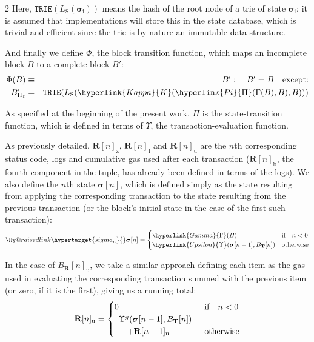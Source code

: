 \documentclass[9pt,oneside]{amsart}
\makeatletter
\newcommand{\linkdest}[1]{\Hy@raisedlink{\hypertarget{#1}{}}}
\makeatother
\begin{document}
\begin{multicols}{2}
Here, $\mathtt{TRIE}(L_{\mathrm{S}}(\boldsymbol{\sigma}_{\mathrm{i}}))$ means the hash of the root node of a trie of state $\boldsymbol{\sigma}_{\mathrm{i}}$; it is assumed that implementations will store this in the state database, which is trivial and efficient since the trie is by nature an immutable data structure.

\hypertarget{Phi}{}And finally we define $\Phi$, the block transition function, which maps an incomplete block $B$ to a complete block $B'$:
\begin{eqnarray}
\Phi(B) & \equiv & B': \quad B' = B \quad \text{except:} \\
{B'_{\mathrm{H}}}_{\mathrm{r}} & = & \mathtt{TRIE}(L_{\mathrm{S}}(\hyperlink{Kappa}{K}(\hyperlink{Pi}{\Pi}(\Gamma(B), B), B)))
\end{eqnarray}

As specified at the beginning of the present work, \hyperlink{Pi}{$\Pi$} is the state-transition function, which is defined in terms of \hyperlink{Upsilon_state_transition}{$\Upsilon$}, the transaction-evaluation function.

As previously detailed, $\mathbf{R}[n]_{\mathrm{z}}$, $\mathbf{R}[n]_{\mathbf{l}}$ and $\mathbf{R}[n]_{\mathrm{u}}$ are the $n$th corresponding status code, logs and cumulative gas used after each transaction ($\mathbf{R}[n]_{\mathrm{b}}$, the fourth component in the tuple, has already been defined in terms of the logs). We also define the $n$th state $\boldsymbol{\sigma}[n]$, which is defined simply as the state resulting from applying the corresponding transaction to the state resulting from the previous transaction (or the block's initial state in the case of the first such transaction):
\begin{equation}\linkdest{sigma_n}{}
\boldsymbol{\sigma}[n] = \begin{cases} \hyperlink{Gamma}{\Gamma}(B) & \text{if} \quad n < 0 \\ \hyperlink{Upsilon}{\Upsilon}(\boldsymbol{\sigma}[n - 1], B_{\mathbf{T}}[n]) & \text{otherwise} \end{cases}
\end{equation}

In the case of $B_{\mathbf{R}}[n]_{\mathrm{u}}$, we take a similar approach defining each item as the gas used in evaluating the corresponding transaction summed with the previous item (or zero, if it is the first), giving us a running total:
\begin{equation}
\mathbf{R}[n]_{\mathrm{u}} = \begin{cases} 0 & \text{if} \quad n < 0 \\
\begin{array}[b]{l}
\Upsilon^g(\boldsymbol{\sigma}[n - 1], B_{\mathbf{T}}[n])\\ \quad + \mathbf{R}[n-1]_{\mathrm{u}}
\end{array}
 & \text{otherwise} \end{cases}
\end{equation}


\end{multicols}
\end{document}
